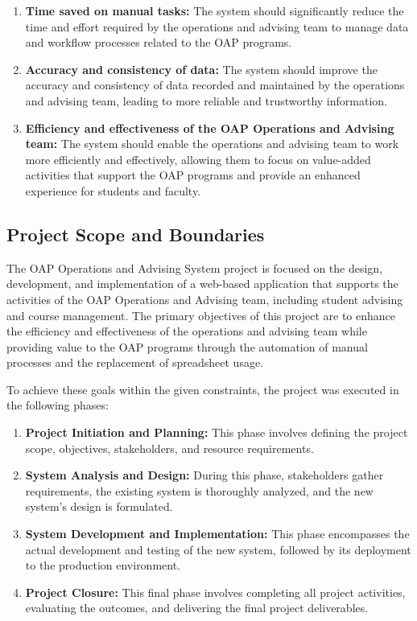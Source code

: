 \documentclass[12pt]{article}
\begin{document}
\begin{enumerate}[label=(\roman*)] 
    \item \textbf{Time saved on manual tasks:} The system should significantly reduce the time and effort required by the operations and advising team to manage data and workflow processes related to the OAP programs. 
    \item \textbf{Accuracy and consistency of data:} The system should improve the accuracy and consistency of data recorded and maintained by the operations and advising team, leading to more reliable and trustworthy information. 
    \item \textbf{Efficiency and effectiveness of the OAP Operations and Advising team:} The system should enable the operations and advising team to work more efficiently and effectively, allowing them to focus on value-added activities that support the OAP programs and provide an enhanced experience for students and faculty. 
\end{enumerate}

\subsection{Project Scope and Boundaries}
The OAP Operations and Advising System project is focused on the design, development, and implementation of a web-based application that supports the activities of the OAP Operations and Advising team, including student advising and course management. The primary objectives of this project are to enhance the efficiency and effectiveness of the operations and advising team while providing value to the OAP programs through the automation of manual processes and the replacement of spreadsheet usage.

To achieve these goals within the given constraints, the project was executed in the following phases:

\begin{enumerate}[label=(\roman*)]
    \item \textbf{Project Initiation and Planning:} This phase involves defining the project scope, objectives, stakeholders, and resource requirements.
    \item \textbf{System Analysis and Design:} During this phase, stakeholders gather requirements, the existing system is thoroughly analyzed, and the new system's design is formulated.
    \item \textbf{System Development and Implementation:} This phase encompasses the actual development and testing of the new system, followed by its deployment to the production environment.
    \item \textbf{Project Closure:} This final phase involves completing all project activities, evaluating the outcomes, and delivering the final project deliverables.
\end{enumerate}
\end{document}
